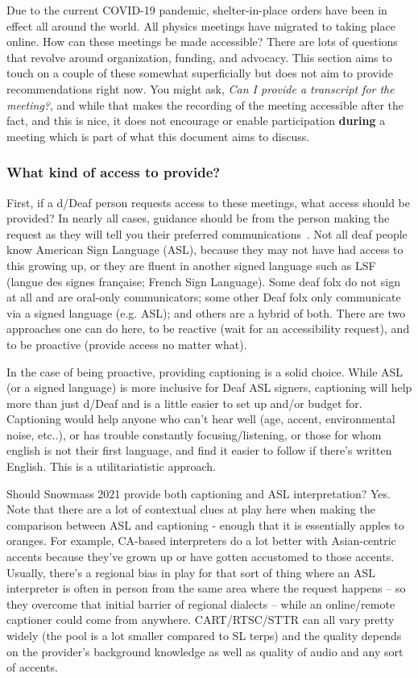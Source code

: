 \documentclass{article}
\begin{document}
  Due to the current COVID-19 pandemic, shelter-in-place orders have been in effect all around the world. All physics meetings have migrated to taking place online. How can these meetings be made accessible? There are lots of questions that revolve around organization, funding, and advocacy. This section aims to touch on a couple of these somewhat superficially but does not aim to provide recommendations right now. You might ask, \textsl{Can I provide a transcript for the meeting?}, and while that makes the recording of the meeting accessible after the fact, and this is nice, it does not encourage or enable participation \textbf{during} a meeting which is part of what this document aims to discuss.

  \subsubsection{What kind of access to provide?}

  First, if a d/Deaf person requests access to these meetings, what access should be provided? In nearly all cases, guidance should be from the person making the request as they will tell you their preferred communications~\cite{chua2017behind}. Not all deaf people know American Sign Language (ASL), because they may not have had access to this growing up, or they are fluent in another signed language such as LSF (langue des signes française; French Sign Language). Some deaf folx do not sign at all and are oral-only communicators; some other Deaf folx only communicate via a signed language (e.g. ASL); and others are a hybrid of both. There are two approaches one can do here, to be reactive (wait for an accessibility request), and to be proactive (provide access no matter what).

  In the case of being proactive, providing captioning is a solid choice. While ASL (or a signed language) is more inclusive for Deaf ASL signers, captioning will help more than just d/Deaf and is a little easier to set up and/or budget for. Captioning would help anyone who can't hear well (age, accent, environmental noise, etc..), or has trouble constantly focusing/listening, or those for whom english is not their first language, and find it easier to follow if there's written English. This is a utilitariatistic approach.

  Should Snowmass 2021 provide both captioning and ASL interpretation? Yes. Note that there are a lot of contextual clues at play here when making the comparison between ASL and captioning - enough that it is essentially apples to oranges. For example, CA-based interpreters do a lot better with Asian-centric accents because they've grown up or have gotten accustomed to those accents. Usually, there's a regional bias in play for that sort of thing where an ASL interpreter is often in person from the same area where the request happens -- so they overcome that initial barrier of regional dialects -- while an online/remote captioner could come from anywhere. CART/RTSC/STTR can all vary pretty widely (the pool is a lot smaller compared to SL terps) and the quality depends on the provider's background knowledge as well as quality of audio and any sort of accents.
\end{document}
